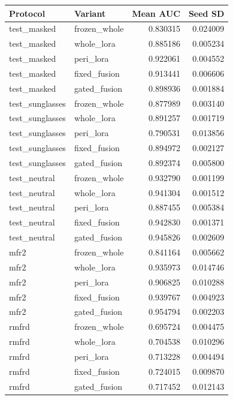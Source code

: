 \documentclass[10pt,journal,onecolumn,compsoc]{IEEEtran}
\begin{document}
\begin{tabular}{llrr}
\toprule
Protocol & Variant & Mean AUC & Seed SD\\
\midrule
test\_masked & frozen\_whole & 0.830315 & 0.024009\\
test\_masked & whole\_lora & 0.885186 & 0.005234\\
test\_masked & peri\_lora & 0.922061 & 0.004552\\
test\_masked & fixed\_fusion & 0.913441 & 0.006606\\
test\_masked & gated\_fusion & 0.898936 & 0.001884\\
test\_sunglasses & frozen\_whole & 0.877989 & 0.003140\\
test\_sunglasses & whole\_lora & 0.891257 & 0.001719\\
test\_sunglasses & peri\_lora & 0.790531 & 0.013856\\
test\_sunglasses & fixed\_fusion & 0.894972 & 0.002127\\
test\_sunglasses & gated\_fusion & 0.892374 & 0.005800\\
test\_neutral & frozen\_whole & 0.932790 & 0.001199\\
test\_neutral & whole\_lora & 0.941304 & 0.001512\\
test\_neutral & peri\_lora & 0.887455 & 0.005384\\
test\_neutral & fixed\_fusion & 0.942830 & 0.001371\\
test\_neutral & gated\_fusion & 0.945826 & 0.002609\\
mfr2 & frozen\_whole & 0.841164 & 0.005662\\
mfr2 & whole\_lora & 0.935973 & 0.014746\\
mfr2 & peri\_lora & 0.906825 & 0.010288\\
mfr2 & fixed\_fusion & 0.939767 & 0.004923\\
mfr2 & gated\_fusion & 0.954794 & 0.002203\\
rmfrd & frozen\_whole & 0.695724 & 0.004475\\
rmfrd & whole\_lora & 0.704538 & 0.010296\\
rmfrd & peri\_lora & 0.713228 & 0.004494\\
rmfrd & fixed\_fusion & 0.724015 & 0.009870\\
rmfrd & gated\_fusion & 0.717452 & 0.012143\\
\bottomrule
\end{tabular}
\end{document}
